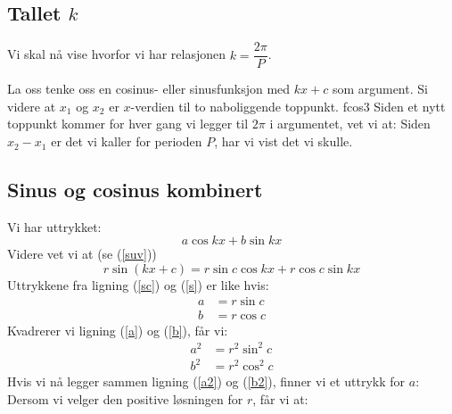 \newpage
{}
\subsection*{Tallet \boldmath$ k $}
Vi skal nå vise hvorfor vi har relasjonen $ k=\dfrac{2\pi}{P} $.

La oss tenke oss en cosinus- eller sinusfunksjon med $ kx+c $ som argument. Si videre at $ x_1 $ og $ x_2 $ er $ x $-verdien til to naboliggende toppunkt. 
{fcos3} 
Siden et nytt toppunkt kommer for hver gang vi legger til $ 2\pi $ i argumentet, vet vi at:
Siden $ x_2-x_1 $ er det vi kaller for perioden $ P $, har vi vist det vi skulle.

\subsection*{Sinus og cosinus kombinert}
Vi har uttrykket:
\begin{equation}
a \cos kx + b \sin kx \label{sc}
\end{equation}
Videre vet vi at (se (\ref{suv}))
\begin{equation}
r \sin(kx+c)= r\sin c\cos kx + r\cos c \sin kx  \label{s}
\end{equation}
Uttrykkene fra ligning (\ref{sc}) og (\ref{s}) er like hvis:
\begin{align}
a &= r\sin c \label{a} \\
b &= r\cos c \label{b}
\end{align}
Kvadrerer vi ligning (\ref{a}) og (\ref{b}), får vi:
\begin{align}
a^2 &= r^2\sin^2 c \label{a2}\\
b^2 &= r^2\cos^2 c \label{b2}
\end{align}
Hvis vi nå legger sammen ligning (\ref{a2}) og (\ref{b2}), finner vi et uttrykk for $a$:
Dersom vi velger den positive løsningen for $ r $, får vi at:



\begin{comment}
\subsection*{Relasjoner}
Fra (\ref{suv}) har vi at:
\alg{\sin \left(kx + c +\frac{\pi}{2}\right) &= \sin (kx +c)\cos \left(\frac{\pi}{2}\right) +\cos (kx +c)\sin \left(\frac{\pi}{2}\right) \\
&= \cos(kx+c)
}
Fra (\ref{cuv}) har vi at:
\alg{\cos \left(kx + c -\frac{\pi}{2}\right) &= \cos (kx +c)\cos \left(-\frac{\pi}{2}\right) -\sin (kx +c)\sin \left(-\frac{\pi}{2}\right) \\
&= \sin(kx+c)
}
\end{comment}
